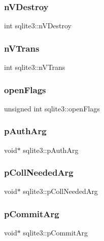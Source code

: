 \mbox{\label{structsqlite3_adfa504e8c5d87a41e191236d0ba80f0a}} 
\subsubsection{nVDestroy}
{\footnotesize\ttfamily int sqlite3\+::n\+V\+Destroy}

\mbox{\label{structsqlite3_a895162274d29fcd0658901bc5dcce99b}} 
\subsubsection{nVTrans}
{\footnotesize\ttfamily int sqlite3\+::n\+V\+Trans}

\mbox{\label{structsqlite3_acfe8618d03dcd195a992886079c3b014}} 
\subsubsection{openFlags}
{\footnotesize\ttfamily unsigned int sqlite3\+::open\+Flags}

\mbox{\label{structsqlite3_a1c50e81c5e4a6e1faeea93489accd53f}} 
\subsubsection{pAuthArg}
{\footnotesize\ttfamily void$\ast$ sqlite3\+::p\+Auth\+Arg}

\mbox{\label{structsqlite3_addbc9c709cc728968132af5487d5c30c}} 
\subsubsection{pCollNeededArg}
{\footnotesize\ttfamily void$\ast$ sqlite3\+::p\+Coll\+Needed\+Arg}

\mbox{\label{structsqlite3_a355237725d3a535d702815b6ef8be75e}} 
\subsubsection{pCommitArg}
{\footnotesize\ttfamily void$\ast$ sqlite3\+::p\+Commit\+Arg}

